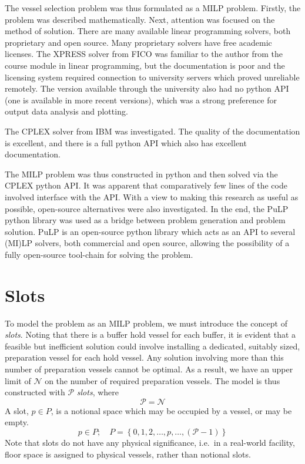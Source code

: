 The vessel selection problem was thus formulated as a MILP problem.
Firstly, the problem was described mathematically.
Next, attention was focused on the method of solution.
There are many available linear programming solvers, both proprietary and open
source.
Many proprietary solvers have free academic licenses.
The XPRESS solver from FICO was familiar to the author from the course module
in linear programming, but the documentation is poor and the licensing system
required connection to university servers which proved unreliable remotely.
The version available through the university also had no python API (one is
available in more recent versions), which was a strong preference for output
data analysis and plotting.

The CPLEX solver from IBM was investigated.
The quality of the documentation is excellent, and there is a full python API
which also has excellent documentation.

The MILP problem was thus constructed in python and then solved via the CPLEX
python API.
It was apparent that comparatively few lines of the code involved interface
with the API.
With a view to making this research as useful as possible, open-source
alternatives were also investigated.
In the end, the PuLP python library was used as a bridge between problem
generation and problem solution.
PuLP is an open-source python library which acts as an API to several
(MI)LP solvers, both commercial and open source, allowing the possibility of a
fully open-source tool-chain for solving the problem.

\section{Slots}\label{S.slots}

To model the problem as an MILP problem, we must introduce the concept of
\emph{slots}.
Noting that there is a buffer hold vessel for each buffer, it is evident that
a feasible but inefficient solution could involve installing a dedicated,
suitably sized, preparation vessel for each hold vessel.
Any solution involving more than this number of preparation vessels cannot
be optimal.
As a result, we have an upper limit of $\mathcal{N}$ on the number of required
preparation vessels.
The model is thus constructed with $\mathcal{P}$ \emph{slots}, where
\begin{equation}
    \mathcal{P} = \mathcal{N}
\end{equation}
A slot, $p \in P$, is a notional space which may be occupied by a vessel, or
may be empty.
\begin{equation}
    p \in P; \quad P = \left\{ 0, 1, 2, \ldots, p, \ldots, \left( 
    \mathcal{P} - 1 \right) \right\}
\end{equation}
Note that slots do not have any physical significance, i.e.\ in a real-world
facility, floor space is assigned to physical vessels, rather than notional
slots.

